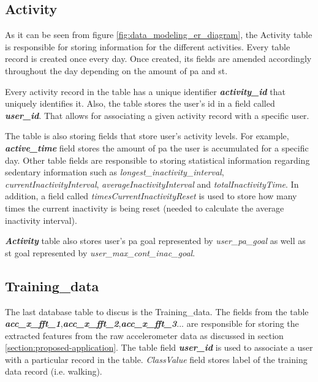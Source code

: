         \subsection{Activity}
        As it can be seen from figure \ref{fig:data_modeling_er_diagram}, the Activity table is responsible for storing information for the different activities. Every table record is created once every day. Once created, its fields are amended accordingly throughout the day depending on the amount of \gls{pa} and \gls{st}. 
        
        Every activity record in the table has a unique identifier \textbf{\textit{activity\_id}} that uniquely identifies it. Also, the table stores the user's id in a field called \textbf{\textit{user\_id}}. That allows for associating a given activity record with a specific user.
        
        The table is also storing fields that store user's activity levels. For example, \textbf{\textit{active\_time}} field stores the amount of \gls{pa} the user is accumulated for a specific day. Other table fields are responsible to storing statistical information regarding sedentary information such as \textit{longest\_inactivity\_interval}, \textit{currentInactivityInterval}, \textit{averageInactivityInterval} and \textit{totalInactivityTime}. In addition, a field called \textit{timesCurrentInactivityReset} is used to store how many times the current inactivity is being reset (needed to calculate the average inactivity interval).
        
        
        \textbf{\textit{Activity}} table also stores user's \gls{pa} goal represented by \textit{user\_pa\_goal} as well as \gls{st} goal represented by \textit{user\_max\_cont\_inac\_goal}.
        
        \subsection{Training\_data}
        The last database table to discus is the Training\_data. The fields from the table \textbf{\textit{acc\_x\_fft\_1}},\newline\textbf{\textit{acc\_x\_fft\_2}},\textbf{\textit{acc\_x\_fft\_3}}... are responsible for storing the extracted features from the raw accelerometer data as discussed in section \ref{section:proposed-application}. The table field \textbf{\textit{user\_id}} is used to associate a user with a particular record in the table. \textit{ClassValue} field stores label of the training data record (i.e. walking).
        
